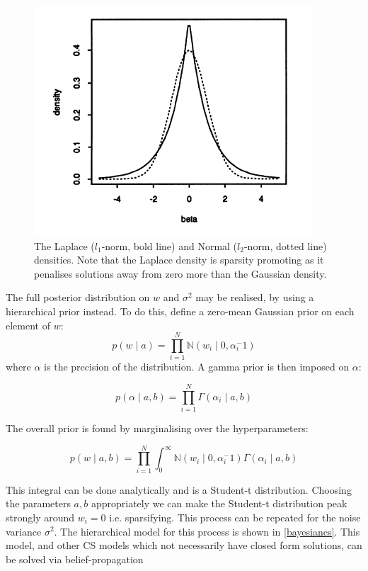 \begin{figure}[h]
\centering
\includegraphics[height = 7 cm]{LaplaceandNormalDensity.png}
\caption{The Laplace (\(l_1\)-norm, bold line) and Normal (\(l_2\)-norm, dotted line) densities. Note that the Laplace density is sparsity promoting as it penalises solutions away from zero more than the Gaussian density. \cite{Tibshirani1996}}
\label{laplacenormal}
\end{figure}

The full posterior distribution on \(w\) and \(\sigma^2\) may be realised, by using a hierarchical prior instead. To do this, define a zero-mean Gaussian prior on each element of \(w\):
%
\begin{equation}
p\left(w\mid a\right) = \prod_{i=1}^{N}\mathbb{N}\left(w_i\mid 0, \alpha_{i}^-1\right)
\end{equation}
%
where \(\alpha\) is the precision of the distribution. A gamma prior is then imposed on \(\alpha\):

\begin{equation}
p\left(\alpha \mid a, b \right) = \prod_{i=1}^{N} \Gamma\left( \alpha_i \mid a, b \right)
\end{equation}

The overall prior is found by marginalising over the hyperparameters:

\begin{equation}
p\left( w \mid a, b \right) = \prod_{i=1}^{N} \int_{0}^{\infty} \mathbb{N}\left(w_i\mid 0, \alpha_{i}^-1\right) \Gamma\left( \alpha_i \mid a, b \right)
\end{equation}

This integral can be done analytically and is a Student-t distribution. Choosing the parameters \(a,b\) appropriately we can make the Student-t distribution peak strongly around \(w_i = 0\) i.e. sparsifying. This process can be repeated for the noise variance \(\sigma^2\). The hierarchical model for this process is shown in \ref{bayesiancs}. This model, and other CS models which not necessarily have closed form solutions, can be solved via belief-propagation \cite{Baron2010}

